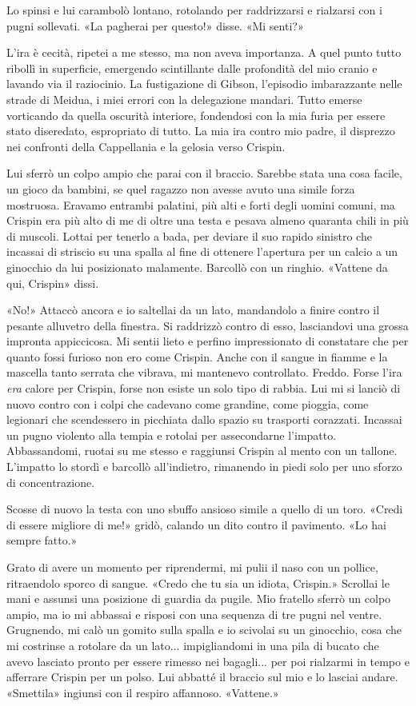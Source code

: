 Lo spinsi e lui carambolò lontano, rotolando per raddrizzarsi e
rialzarsi con i pugni sollevati. «La pagherai per questo!» disse. «Mi
senti?»

L'ira è cecità, ripetei a me stesso, ma non aveva importanza. A quel
punto tutto ribollì in superficie, emergendo scintillante dalle
profondità del mio cranio e lavando via il raziocinio. La fustigazione
di Gibson, l'episodio imbarazzante nelle strade di Meidua, i miei errori
con la delegazione mandari. Tutto emerse vorticando da quella oscurità
interiore, fondendosi con la mia furia per essere stato diseredato,
espropriato di tutto. La mia ira contro mio padre, il disprezzo nei
confronti della Cappellania e la gelosia verso Crispin.

Lui sferrò un colpo ampio che parai con il braccio. Sarebbe stata una
cosa facile, un gioco da bambini, se quel ragazzo non avesse avuto una
simile forza mostruosa. Eravamo entrambi palatini, più alti e forti
degli uomini comuni, ma Crispin era più alto di me di oltre una testa e
pesava almeno quaranta chili in più di muscoli. Lottai per tenerlo a
bada, per deviare il suo rapido sinistro che incassai di striscio su una
spalla al fine di ottenere l'apertura per un calcio a un ginocchio da
lui posizionato malamente. Barcollò con un ringhio. «Vattene da qui,
Crispin» dissi.

«No!» Attaccò ancora e io saltellai da un lato, mandandolo a finire
contro il pesante alluvetro della finestra. Si raddrizzò contro di esso,
lasciandovi una grossa impronta appiccicosa. Mi sentii lieto e perfino
impressionato di constatare che per quanto fossi furioso non ero come
Crispin. Anche con il sangue in fiamme e la mascella tanto serrata che
vibrava, mi mantenevo controllato. Freddo. Forse l'ira \emph{era} calore
per Crispin, forse non esiste un solo tipo di rabbia. Lui mi si lanciò
di nuovo contro con i colpi che cadevano come grandine, come pioggia,
come legionari che scendessero in picchiata dallo spazio su trasporti
corazzati. Incassai un pugno violento alla tempia e rotolai per
assecondarne l'impatto. Abbassandomi, ruotai su me stesso e raggiunsi
Crispin al mento con un tallone. L'impatto lo stordì e barcollò
all'indietro, rimanendo in piedi solo per uno sforzo di concentrazione.

Scosse di nuovo la testa con uno sbuffo ansioso simile a quello di un
toro. «Credi di essere migliore di me!» gridò, calando un dito contro il
pavimento. «Lo hai sempre fatto.»

Grato di avere un momento per riprendermi, mi pulii il naso con un
pollice, ritraendolo sporco di sangue. «Credo che tu sia un idiota,
Crispin.» Scrollai le mani e assunsi una posizione di guardia da pugile.
Mio fratello sferrò un colpo ampio, ma io mi abbassai e risposi con una
sequenza di tre pugni nel ventre. Grugnendo, mi calò un gomito sulla
spalla e io scivolai su un ginocchio, cosa che mi costrinse a rotolare
da un lato... impigliandomi in una pila di bucato che avevo lasciato
pronto per essere rimesso nei bagagli... per poi rialzarmi in tempo e
afferrare Crispin per un polso. Lui abbatté il braccio sul mio e lo
lasciai andare. «Smettila» ingiunsi con il respiro affannoso. «Vattene.»

